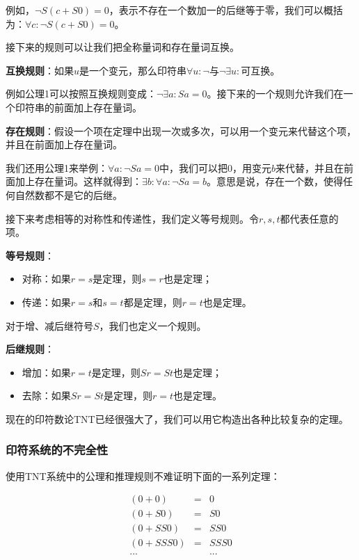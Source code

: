 \documentclass{article}
\begin{document}
例如，$\lnot S(c + S0) = 0$，表示不存在一个数加一的后继等于零，我们可以概括为：$\forall c: \lnot S(c + S0) = 0$。

接下来的规则可以让我们把全称量词和存在量词互换。

\textbf{互换规则}：如果$u$是一个变元，那么印符串$\forall u: \lnot $与$\lnot \exists u:$可互换。

例如公理1可以按照互换规则变成：$\lnot \exists a: Sa = 0$。接下来的一个规则允许我们在一个印符串的前面加上存在量词。

\textbf{存在规则}：假设一个项在定理中出现一次或多次，可以用一个变元来代替这个项，并且在前面加上存在量词。

我们还用公理1来举例：$\forall a: \lnot Sa = 0$中，我们可以把0，用变元$b$来代替，并且在前面加上存在量词。这样就得到：$\exists b: \forall a: \lnot Sa = b$。意思是说，存在一个数，使得任何自然数都不是它的后继。

接下来考虑相等的对称性和传递性，我们定义等号规则。令$r, s, t$都代表任意的项。

\textbf{等号规则}：
\begin{itemize}
\item 对称：如果$r = s$是定理，则$s = r$也是定理；
\item 传递：如果$r = s$和$s = t$都是定理，则$r = t$也是定理。
\end{itemize}

对于增、减后继符号$S$，我们也定义一个规则。

\textbf{后继规则}：
\begin{itemize}
\item 增加：如果$r = t$是定理，则$Sr = St$也是定理；
\item 去除：如果$Sr = St$是定理，则$r = t$也是定理。
\end{itemize}

现在的印符数论TNT已经很强大了，我们可以用它构造出各种比较复杂的定理。

\begin{Exercise}
\end{Exercise}

\subsubsection{印符系统的不完全性}

使用TNT系统中的公理和推理规则不难证明下面的一系列定理：

\[
\begin{array}{rcl}
(0 + 0) & = & 0 \\
(0 + S0) & = & S0 \\
(0 + SS0) & = & SS0 \\
(0 + SSS0) & = & SSS0 \\
... & & ...
\end{array}
\]
\end{document}
